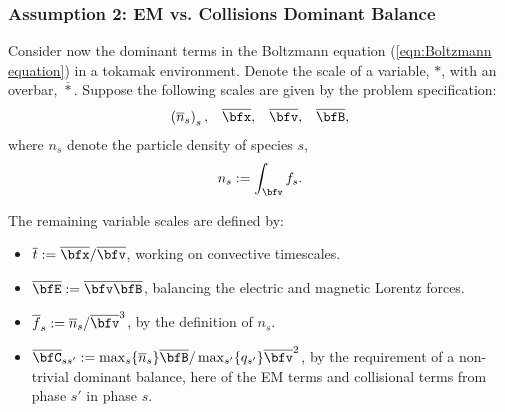 \subsubsection*{Assumption 2: EM vs. Collisions Dominant Balance}
    Consider now the dominant terms in the Boltzmann equation (\ref{eqn:Boltzmann equation}) in a tokamak environment. Denote the scale of a variable, $*$, with an overbar, $\overline{*}$. Suppose the following scales are given by the problem specification:
    \begin{align}
        \left(\overline{n}_{s}\right)_{s},         &&
        \overline{\bfx},                           &&
        \overline{\bfv},                           &&
        \overline{\bfB},
    \end{align}
    where $n_{s}$ denote the particle density of species $s$,
    \begin{equation}
        n_{s}  :=  \int_{\bfv}f_{s}.
    \end{equation}

    
    The remaining variable scales are defined by:
    \begin{itemize}
        \item  $\overline{t}           :=  \overline{\bfx}/\overline{\bfv}$, working on convective timescales.
        \item  $\overline{\bfE}        :=  \overline{\bfv}\overline{\bfB}$, balancing the electric and magnetic Lorentz forces. 
        \item  $\overline{f}_{s}       :=  \overline{n}_{s}/\overline{\bfv}^{3}$, by the definition of $n_{s}$.
        \item  $\overline{\bfC}_{ss'}  :=  \max_{s}\{\overline{n}_{s}\}\overline{\bfB}/\max_{s'}\{q_{s'}\}\overline{\bfv}^{2}$, by the requirement of a non-trivial dominant balance, here of the EM terms and collisional terms from phase $s'$ in phase $s$. 
    \end{itemize}
    
